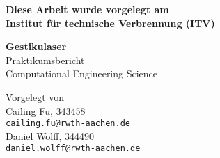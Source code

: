 
\begin{titlepage}
	\small
	\vspace*{4mm}%
	\parindent0pt%
	\begin{center}
		\bfseries Diese Arbeit wurde vorgelegt am
		\\Institut für technische Verbrennung (ITV)
	\end{center}
	\vspace*{15mm}
	\normalsize	
	\begin{center}
		\huge
		{\bfseries\sffamily Gestikulaser}
		\\[20mm]
		\large
		Praktikumsbericht\\Computational Engineering Science
	\end{center}
	\vfill
	\begin{center}
	\large \mydate{\today}
	\end{center}
	\vfill
	\begin{center}
		Vorgelegt von \\[3ex]
		Cailing Fu, 343458 \\
		\texttt{cailing.fu@rwth-aachen.de} \\[2ex]
		Daniel Wolff, 344490 \\
		\texttt{daniel.wolff@rwth-aachen.de} \\[1ex]
	\end{center}
\end{titlepage}